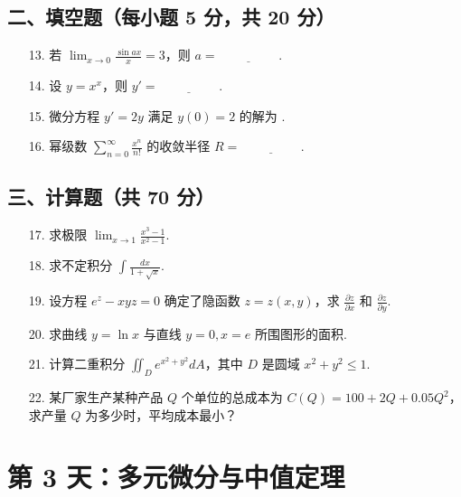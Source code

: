 \documentclass[11pt,a4paper]{article}
\begin{document}
\subsection*{二、填空题（每小题 5 分，共 20 分）}
\begin{enumerate}
    \item[13.] 若 $\lim_{x \to 0} \frac{\sin ax}{x} = 3$，则 $a = \underline{\hspace{2cm}}$.
    \item[14.] 设 $y = x^x$，则 $y' = \underline{\hspace{2cm}}$.
    \item[15.] 微分方程 $y' = 2y$ 满足 $y(0)=2$ 的解为 \underline{\hspace{2cm}}.
    \item[16.] 幂级数 $\sum_{n=0}^{\infty} \frac{x^n}{n!}$ 的收敛半径 $R = \underline{\hspace{2cm}}$.
\end{enumerate}
\subsection*{三、计算题（共 70 分）}
\begin{enumerate}
    \item[17.] 求极限 $\lim_{x \to 1} \frac{x^3 - 1}{x^2 - 1}$.
    \item[18.] 求不定积分 $\int \frac{dx}{1 + \sqrt{x}}$.
    \item[19.] 设方程 $e^z - xyz = 0$ 确定了隐函数 $z=z(x, y)$，求 $\frac{\partial z}{\partial x}$ 和 $\frac{\partial z}{\partial y}$.
    \item[20.] 求曲线 $y = \ln x$ 与直线 $y=0, x=e$ 所围图形的面积.
    \item[21.] 计算二重积分 $\iint_D e^{x^2+y^2} dA$，其中 $D$ 是圆域 $x^2+y^2 \le 1$.
    \item[22.] 某厂家生产某种产品 $Q$ 个单位的总成本为 $C(Q) = 100 + 2Q + 0.05Q^2$，求产量 $Q$ 为多少时，平均成本最小？
\end{enumerate}

\newpage

\section*{第 3 天：多元微分与中值定理}
\end{document}
